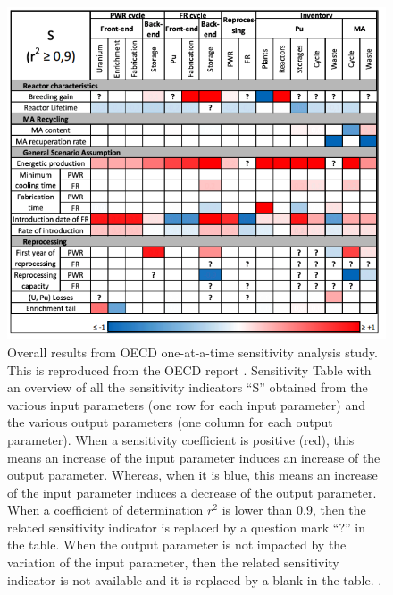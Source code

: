 \begin{figure}[]
	\begin{center}
		\includegraphics[scale=0.75]{./figures/oecd-sensitivitytable.png}
	\end{center}	
        \caption{Overall results from OECD one-at-a-time sensitivity analysis 
        study. This is reproduced from the OECD report \cite{noauthor_effects_2017}.
        Sensitivity Table with an overview of all the sensitivity indicators 
        “S” obtained from the various input
        parameters (one row for each input parameter) and the various output parameters (one
        column for each output parameter). When a sensitivity coefficient is positive (red), this means an increase 
        of the input parameter induces an increase of the output parameter. Whereas, when it is blue, 
        this means an increase of the input parameter induces a decrease of the output parameter.
        When a coefficient of determination $r^2$ is lower than 0.9, then the related sensitivity
        indicator is replaced by a question mark “?” in the table.
        When the output parameter is not impacted by the variation of the input parameter, then
        the related sensitivity indicator is not available and it is replaced by a blank in the table.
        \cite{noauthor_effects_2017}.
        }
	\label{fig:oecd-sensitivitytable}
\end{figure}

